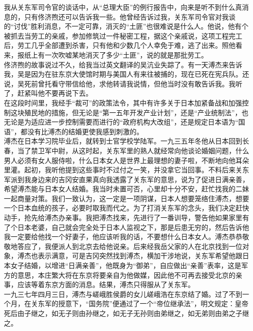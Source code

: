 我从关东军司令官的谈话中，从“总理大臣”的例行报告中，向来是听不到什么真消息的，只有佟济煦还可以告诉我一些。他曾经告诉过我，关东军司令官对我谈的“讨伐”胜利消息，不一定可靠，消灭的“土匪”也很难说是什么人。他说，他有个被抓去当劳工的亲戚，参加修筑过一件秘密工程，据这个亲戚说，这项工程完工后，劳工几乎全部遭到杀害，只有他和少数几个人幸免于难，逃了出来。照他看来，报纸上有一次吹嘘某地消灭了多少“土匪”，说的就是那批劳工。\\

佟济煦的故事说过不久，给我当过英文翻译的吴沆业失踪了。有一天溥杰来告诉我，吴是因为在驻东京大使馆时期与美国人有来往被捕的，现在已死在宪兵队。还说，吴死前曾托看守带信给他，求他转请我说情，但他当时没有敢告诉我。我听了，赶紧叫他不要再说下去。\\

在这段时间里，我经手“裁可”的政策法令，其中有许多关于日本加紧备战和加强控制这块殖民地的措施，但无论是“第一五年开发产业计划”，还是“产业统制法”，也无论是为适应进一步控制需要而进行的“政府机构大改组”，还是规定日本语为“国语”，都没有比溥杰的结婚更使我感到刺激的。\\

溥杰在日本学习院毕业后，就转到士官学校学陆军。一九三五年冬他从日本回到长春，当了禁卫军中尉，从这时起，关东军里的熟人就经常向他谈论婚姻问题，什么男人必须有女人服侍啦，什么日本女人是世界上最理想的妻子啦，不断地向他耳朵里灌。起初，我听他提到这些事时不过付之一笑，并没拿它当回事。不料后来关东军派到我身边来的吉冈安直果真向我透露了关东军的意思，说为了促进日满亲善，希望溥杰能与日本女人结婚。我当时未置可否，心里却十分不安，赶忙找我的二妹一起商量对策。我们一致认为，这一定是一项阴谋，日本人想要笼络住溥杰，想要一个日本血统的孩子，必要时取我而代之。为了打消关东军的念头，我们决定赶快动手，抢先给溥杰办亲事。我把溥杰找来，先进行了一番训导，警告他如果家里有了个日本老婆，自己就会完全处于日本人监视之下，那是后患无穷的，然后告诉他我一定要给他找一个好妻子，他应该听我的话，不要想什么日本女人。溥杰恭恭敬敬地答应了，我便派人到北京去给他说亲。后来经我岳父家的人在北京找到一位对象，溥杰也表示满意，可是吉冈突然找到溥杰，横加干涉地说，关东军希望他跟日本女子结婚，以增进“日满亲善”，他既身为“御弟”，自应做出“亲善”表率，这是军方的意思，本庄繁大将在东京将要亲自为他做媒，因此他不可再去接受北京的亲事，应该等着东京方面的消息。结果，溥杰只得服从了关东军。\\

一九三七年四月三日，溥杰与嵯峨胜侯爵的女儿嵯峨浩在东京结了婚。过了不到一个月，在关东军的授意下，“国务院”便通过了一个“帝位继承法”，明文规定：皇帝死后由子继之，如无子则由孙继之，如无子无孙则由弟继之，如无弟则由弟之子继之。\\

